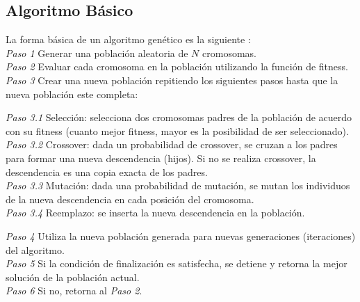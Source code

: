 \subsection{Algoritmo Básico}
La forma básica de un algoritmo genético es la siguiente \cite{grosan2011intelligent}: \\

\noindent\emph{Paso 1} Generar una población aleatoria de $N$ cromosomas. \\
\emph{Paso 2} Evaluar cada cromosoma en la población utilizando la función de fitness. \\
\emph{Paso 3} Crear una nueva población repitiendo los siguientes pasos hasta que la nueva población este completa:
\begin{adjustwidth}{1.5cm}{}
\emph{Paso 3.1} Selección: selecciona dos cromosomas padres de la población de acuerdo con su fitness (cuanto mejor fitness, mayor es la posibilidad de ser seleccionado). \\
\emph{Paso 3.2} Crossover: dada un probabilidad de crossover, se cruzan a los padres para formar una nueva descendencia (hijos). Si no se realiza crossover, la descendencia es una copia exacta de los padres. \\
\emph{Paso 3.3} Mutación: dada una probabilidad de mutación, se mutan los individuos de la nueva descendencia en cada posición del cromosoma. \\
\emph{Paso 3.4} Reemplazo: se inserta la nueva descendencia en la población. \\
\end{adjustwidth}
\emph{Paso 4} Utiliza la nueva población generada para nuevas generaciones (iteraciones) del algoritmo. \\
\emph{Paso 5} Si la condición de finalización es satisfecha, se detiene y retorna la mejor solución de la población actual. \\
\emph{Paso 6} Si no, retorna al \emph{Paso 2}. \\
